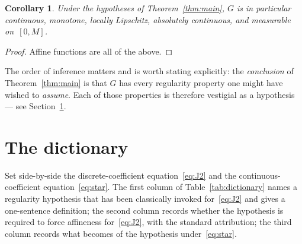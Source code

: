 \documentclass[11pt,a4paper]{amsart}
\newtheorem{corollary}[theorem]{Corollary}
\begin{document}
\begin{corollary}
\label{cor:regularity}
Under the hypotheses of Theorem~\ref{thm:main}, $G$ is in particular
continuous, monotone, locally Lipschitz, absolutely continuous, and
measurable on~$[0,M]$.
\end{corollary}

\begin{proof}
Affine functions are all of the above.
\end{proof}

The order of inference matters and is worth stating explicitly: the
\emph{conclusion} of Theorem~\ref{thm:main} is that $G$ has every regularity
property one might have wished to \emph{assume}. Each of those properties is
therefore vestigial as a hypothesis --- see Section~\ref{sec:dictionary}.

\section{The dictionary}
\label{sec:dictionary}

Set side-by-side the discrete-coefficient equation~\eqref{eq:J2} and the
continuous-coefficient equation~\eqref{eq:star}. The first column of
Table~\ref{tab:dictionary} names a regularity hypothesis that has been
classically invoked for~\eqref{eq:J2} and gives a one-sentence definition;
the second column records whether the hypothesis is required to force
affineness for~\eqref{eq:J2}, with the standard attribution; the third
column records what becomes of the hypothesis under~\eqref{eq:star}.
\end{document}

